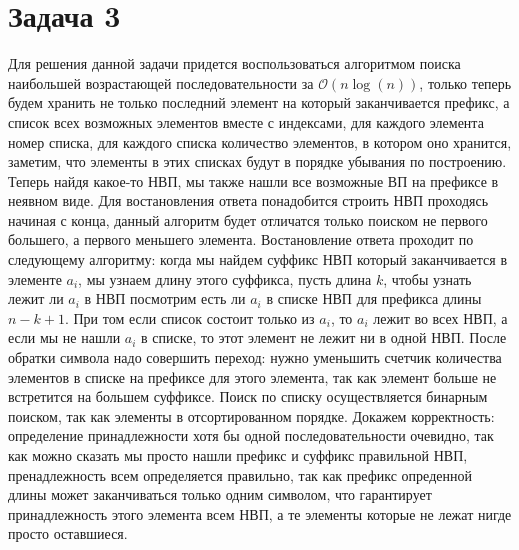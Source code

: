 \documentclass{article}
\begin{document}
	\section*{Задача 3}
	Для решения данной задачи придется воспользоваться алгоритмом поиска наибольшей возрастающей последовательности за $\mathcal{O}(n\log(n))$, только теперь будем хранить не только последний элемент на который заканчивается префикс, а список всех возможных элементов вместе с индексами, для каждого элемента номер списка, для каждого списка количество элементов, в котором оно хранится, заметим, что элементы в этих списках будут в порядке убывания по построению. Теперь найдя какое-то НВП, мы также нашли все возможные ВП на префиксе в неявном виде. Для востановления ответа понадобится строить НВП проходясь начиная с конца, данный алгоритм будет отличатся только поиском не первого большего, а первого меньшего элемента. Востановление ответа проходит по следующему алгоритму: когда мы найдем суффикс НВП который заканчивается в элементе $a_i$, мы узнаем длину этого суффикса, пусть длина $k$, чтобы узнать лежит ли $a_i$ в НВП посмотрим есть ли $a_i$ в списке НВП для префикса длины $n - k + 1$. При том если список состоит только из $a_i$, то $a_i$ лежит во всех НВП, а если мы не нашли $a_i$ в списке, то этот элемент не лежит ни в одной НВП. После обратки символа надо совершить переход: нужно уменьшить счетчик количества элементов в списке на префиксе для этого элемента, так как элемент больше не встретится на большем суффиксе. Поиск по списку осуществляется бинарным поиском, так как элементы в отсортированном порядке. Докажем корректность: определение принадлежности хотя бы одной последовательности очевидно, так как можно сказать мы просто нашли префикс и суффикс правильной НВП, пренадлежность всем определяется правильно, так как префикс опреденной длины может заканчиваться только одним символом, что гарантирует принадлежность этого элемента всем НВП, а те элементы которые не лежат нигде просто оставшиеся.
	
	
\end{document}
